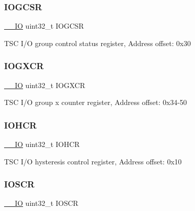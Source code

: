 \subsubsection{\texorpdfstring{I\+O\+G\+C\+SR}{IOGCSR}}
{\footnotesize\ttfamily \hyperlink{core__sc300_8h_aec43007d9998a0a0e01faede4133d6be}{\+\_\+\+\_\+\+IO} uint32\+\_\+t I\+O\+G\+C\+SR}

T\+SC I/O group control status register, Address offset\+: 0x30 \mbox{\label{struct_t_s_c___type_def_a517b87daa59a395d1ba68fd9600ec6a1}} 
\subsubsection{\texorpdfstring{I\+O\+G\+X\+CR}{IOGXCR}}
{\footnotesize\ttfamily \hyperlink{core__sc300_8h_aec43007d9998a0a0e01faede4133d6be}{\+\_\+\+\_\+\+IO} uint32\+\_\+t I\+O\+G\+X\+CR}

T\+SC I/O group x counter register, Address offset\+: 0x34-\/50 \mbox{\label{struct_t_s_c___type_def_a2eaed98d8be30aa1f577f65817e37b2d}} 
\subsubsection{\texorpdfstring{I\+O\+H\+CR}{IOHCR}}
{\footnotesize\ttfamily \hyperlink{core__sc300_8h_aec43007d9998a0a0e01faede4133d6be}{\+\_\+\+\_\+\+IO} uint32\+\_\+t I\+O\+H\+CR}

T\+SC I/O hysteresis control register, Address offset\+: 0x10 \mbox{\label{struct_t_s_c___type_def_af63334a3c8d2a8672fb7b603e4832817}} 
\subsubsection{\texorpdfstring{I\+O\+S\+CR}{IOSCR}}
{\footnotesize\ttfamily \hyperlink{core__sc300_8h_aec43007d9998a0a0e01faede4133d6be}{\+\_\+\+\_\+\+IO} uint32\+\_\+t I\+O\+S\+CR}

